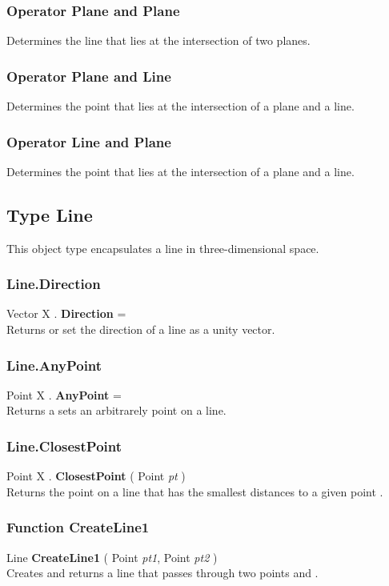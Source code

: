 \subsubsection{Operator Plane  and  Plane \label{O:Plane and Plane}}
Determines the line that lies at the intersection of two planes.

\subsubsection{Operator Plane  and  Line \label{O:Plane and Line}}
Determines the point that lies at the intersection of a plane and a line.

\subsubsection{Operator Line  and  Plane \label{O:Line and Plane}}
Determines the point that lies at the intersection of a plane and a line.

\subsection{Type Line \label{T:Line}}
This object type encapsulates a line in three-dimensional space.

\subsubsection{Line.Direction \label{F:Line:Direction}}
Vector X . \textbf{Direction} = \\
Returns or set the direction of a line as a unity vector.

\subsubsection{Line.AnyPoint \label{F:Line:AnyPoint}}
Point X . \textbf{AnyPoint} = \\
Returns a sets an arbitrarely point on a line.

\subsubsection{Line.ClosestPoint \label{F:Line:ClosestPoint}}
Point X . \textbf{ClosestPoint} ( Point \textit{pt} ) \\
Returns the point on a line that has the smallest distances to a given point .

\subsubsection{Function CreateLine1 \label{F:CreateLine1}}
Line \textbf{CreateLine1} ( Point \textit{pt1}, Point \textit{pt2} ) \\
Creates and returns a line that passes through two points  and .

